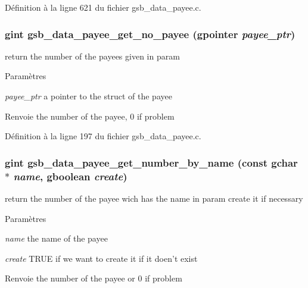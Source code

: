 Définition à la ligne 621 du fichier gsb\_\-data\_\-payee.c.

\subsubsection[{gsb\_\-data\_\-payee\_\-get\_\-no\_\-payee}]{\setlength{\rightskip}{0pt plus 5cm}gint gsb\_\-data\_\-payee\_\-get\_\-no\_\-payee (gpointer {\em payee\_\-ptr})}\label{gsb__data__payee_8h_a8fba569c8347fa6e1f98f5f396d6a518}
return the number of the payees given in param


\begin{DoxyParams}{Paramètres}
\item[{\em payee\_\-ptr}]a pointer to the struct of the payee\end{DoxyParams}
\begin{DoxyReturn}{Renvoie}
the number of the payee, 0 if problem 
\end{DoxyReturn}


Définition à la ligne 197 du fichier gsb\_\-data\_\-payee.c.

\subsubsection[{gsb\_\-data\_\-payee\_\-get\_\-number\_\-by\_\-name}]{\setlength{\rightskip}{0pt plus 5cm}gint gsb\_\-data\_\-payee\_\-get\_\-number\_\-by\_\-name (const gchar $\ast$ {\em name}, \/  gboolean {\em create})}\label{gsb__data__payee_8h_a0841102ff1dc4d499187b11a187fe92d}
return the number of the payee wich has the name in param create it if necessary


\begin{DoxyParams}{Paramètres}
\item[{\em name}]the name of the payee \item[{\em create}]TRUE if we want to create it if it doen't exist\end{DoxyParams}
\begin{DoxyReturn}{Renvoie}
the number of the payee or 0 if problem 
\end{DoxyReturn}



